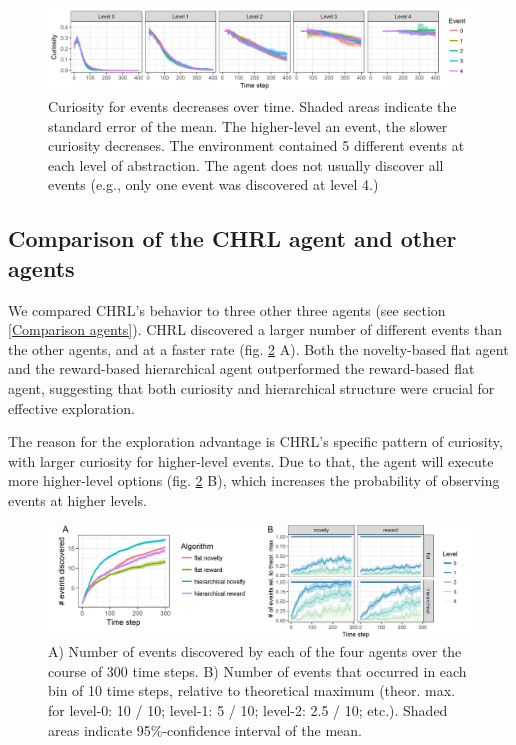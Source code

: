\documentclass{article}
\begin{document}
\begin{figure}[h]
	\centering
	\includegraphics[width=\linewidth]{ACuriosity.png}
	\caption{Curiosity for events decreases over time. Shaded areas indicate the standard error of the mean. The higher-level an event, the slower curiosity decreases. The environment contained 5 different events at each level of abstraction. The agent does not usually discover all events (e.g., only one event was discovered at level 4.)}
	\label{CuriosityFigure}
\end{figure}

\subsection{Comparison of the CHRL agent and other agents} \label{Results compare all}

We compared CHRL's behavior to three other three agents (see section \ref{Comparison agents}). CHRL discovered a larger number of different events than the other agents, and at a faster rate (fig. \ref{CEvents} A). Both the novelty-based flat agent and the reward-based hierarchical agent outperformed the reward-based flat agent, suggesting that both curiosity and hierarchical structure were crucial for effective exploration.

The reason for the exploration advantage is CHRL's specific pattern of curiosity, with larger curiosity for higher-level events. Due to that, the agent will execute more higher-level options (fig. \ref{CEvents} B), which increases the probability of observing events at higher levels. 

\begin{figure}[h]
	\centering
	\includegraphics[width=\linewidth]{CEvents.jpg}
	\caption{A) Number of events discovered by each of the four agents over the course of 300 time steps. B) Number of events that occurred in each bin of 10 time steps, relative to theoretical maximum (theor. max. for level-0: 10 / 10; level-1: 5 / 10; level-2: 2.5 / 10; etc.). Shaded areas indicate 95\%-confidence interval of the mean.}
	\label{CEvents}
\end{figure}
\end{document}
